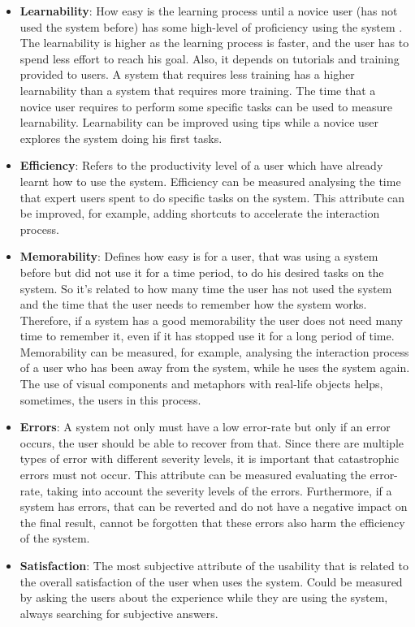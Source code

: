 \begin{itemize}
	\item \textbf{Learnability}: How easy is the learning process until a novice user (has not used the system before) has some high-level of proficiency using the system \cite{measuringLearnabilityInHumanComputerInteraction}. The learnability is higher as the learning process is faster, and the user has to spend less effort to reach his goal. Also, it depends on tutorials and training provided to users. A system that requires less training has a higher learnability than a system that requires more training. The time that a novice user requires to perform some specific tasks can be used to measure learnability. Learnability can be improved using tips while a novice user explores the system doing his first tasks.
	\item \textbf{Efficiency}: Refers to the productivity level of a user which have already learnt how to use the system. Efficiency can be measured analysing the time that expert users spent to do specific tasks on the system. This attribute can be improved, for example, adding shortcuts to accelerate the interaction process.
	\item \textbf{Memorability}: Defines how easy is for a user, that was using a system before but did not use it for a time period, to do his desired tasks on the system. So it’s related to how many time the user has not used the system and the time that the user needs to remember how the system works. Therefore, if a system has a good memorability the user does not need many time to remember it, even if it has stopped use it for a long period of time. Memorability can be measured, for example, analysing the interaction process of a user who has been away from the system, while he uses the system again. The use of visual components and metaphors with real-life objects helps, sometimes, the users in this process.
	\item \textbf{Errors}: A system not only must have a low error-rate but only if an error occurs, the user should be able to recover from that. Since there are multiple types of error with different severity levels, it is important that catastrophic errors must not occur. This attribute can be measured evaluating the error-rate, taking into account the severity levels of the errors. Furthermore, if a system has errors, that can be reverted and do not have a negative impact on the final result, cannot be forgotten that these errors also harm the efficiency of the system.
	\item \textbf{Satisfaction}: The most subjective attribute of the usability that is related to the overall satisfaction of the user when uses the system. Could be measured by asking the users about the experience while they are using the system, always searching for subjective answers.
\end{itemize}

